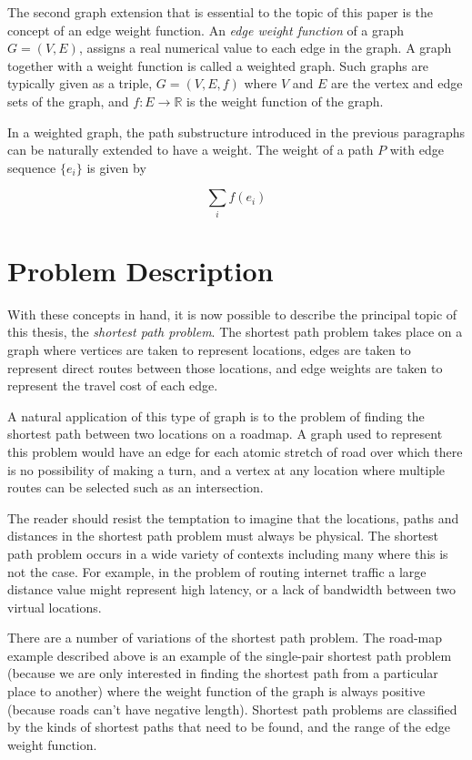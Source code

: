 \documentclass[12pt,twoside]{reedthesis}
\newcommand{\im}[1]{{\em#1}}
\begin{document}
The second graph extension that is essential to the topic of this paper is the concept of an edge weight function. An \im{edge weight function} of a graph $G = (V,E)$, assigns a real numerical value to each edge in the graph. A graph together with a weight function is called a weighted graph. Such graphs are typically given as a triple, $G = (V,E,f)$ where $V$ and $E$ are the vertex and edge sets of the graph, and $f : E \rightarrow \mathbb{R}$ is the weight function of the graph.

In a weighted graph, the path substructure introduced in the previous paragraphs can be naturally extended to have a weight. The weight of a path $P$ with edge sequence $\{e_i\}$ is given by

$$
\sum_i f(e_i)
$$

\section{Problem Description}

With these concepts in hand, it is now possible to describe the principal topic of this thesis, the \im{shortest path problem}. The shortest path problem takes place on a graph where vertices are taken to represent locations, edges are taken to represent direct routes between those locations, and edge weights are taken to represent the travel cost of each edge.

A natural application of this type of graph is to the problem of finding the shortest path between two locations on a roadmap. A graph used to represent this problem would have an edge for each atomic stretch of road over which there is no possibility of making a turn, and a vertex at any location where multiple routes can be selected such as an intersection.

The reader should resist the temptation to imagine that the locations, paths and distances in the shortest path problem must always be physical. The shortest path problem occurs in a wide variety of contexts including many where this is not the case. For example, in the problem of routing internet traffic a large distance value might represent high latency, or a lack of bandwidth between two virtual locations.

There are a number of variations of the shortest path problem. The road-map example described above is an example of the single-pair shortest path problem (because we are only interested in finding the shortest path from a particular place to another) where the weight function of the graph is always positive (because roads can't have negative length). Shortest path problems are classified by the kinds of shortest paths that need to be found, and the range of the edge weight function.
\end{document}
